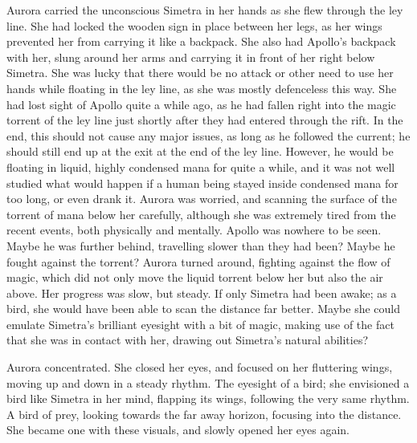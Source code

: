 \froufrou{}

Aurora carried the unconscious Simetra in her hands as she flew through the ley line. She had locked the wooden sign in place between her legs, as her wings prevented her from carrying it like a backpack. She also had Apollo's backpack with her, slung around her arms and carrying it in front of her right below Simetra. She was lucky that there would be no attack or other need to use her hands while floating in the ley line, as she was mostly defenceless this way. She had lost sight of Apollo quite a while ago, as he had fallen right into the magic torrent of the ley line just shortly after they had entered through the rift. In the end, this should not cause any major issues, as long as he followed the current; he should still end up at the exit at the end of the ley line. However, he would be floating in liquid, highly condensed mana for quite a while, and it was not well studied what would happen if a human being stayed inside condensed mana for too long, or even drank it. Aurora was worried, and scanning the surface of the torrent of mana below her carefully, although she was extremely tired from the recent events, both physically and mentally. Apollo was nowhere to be seen. Maybe he was further behind, travelling slower than they had been? Maybe he fought against the torrent? Aurora turned around, fighting against the flow of magic, which did not only move the liquid torrent below her but also the air above. Her progress was slow, but steady. If only Simetra had been awake; as a bird, she would have been able to scan the distance far better. Maybe she could emulate Simetra's brilliant eyesight with a bit of magic, making use of the fact that she was in contact with her, drawing out Simetra's natural abilities? 

Aurora concentrated. She closed her eyes, and focused on her fluttering wings, moving up and down in a steady rhythm. The eyesight of a bird; she envisioned a bird like Simetra in her mind, flapping its wings, following the very same rhythm. A bird of prey, looking towards the far away horizon, focusing into the distance. She became one with these visuals, and slowly opened her eyes again.

